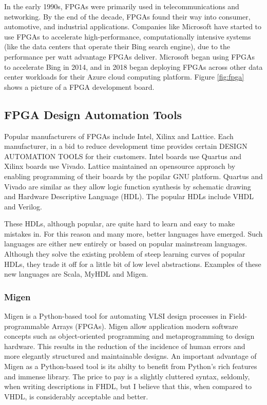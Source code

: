 In the early 1990s, FPGAs were primarily used in telecommunications and networking. By the end of the
decade, FPGAs found their way into consumer, automotive, and industrial applications.
Companies like Microsoft have started to use FPGAs to accelerate high-performance,
computationally intensive systems (like the data centers that operate their Bing search engine),
due to the performance per watt advantage FPGAs deliver. Microsoft began using FPGAs to
accelerate Bing in 2014, and in 2018 began deploying FPGAs across other data center
workloads for their Azure cloud computing platform. Figure \ref{fig:fpga} shows a picture of a FPGA development board.

\subsection{FPGA Design Automation Tools}
Popular manufacturers of FPGAs include Intel, Xilinx and Lattice. Each manufacturer, in a
bid to reduce development time provides certain DESIGN AUTOMATION TOOLS for their
customers. Intel boards use Quartus and Xilinx boards use Vivado. Lattice maintained an
opensource approach by enabling programming of their boards by the popilar GNU platform.
Quartus and Vivado are similar as they allow logic function synthesis by schematic drawing
and Hardware Descriptive Language (HDL). The popular HDLs include VHDL and Verilog. 

These HDLs, although popular, are quite hard to learn and easy to make mistakes in. For this reason and many more, better languages have emerged. Such languages are either new entirely or based on popular mainstream languages. Although they solve the existing problem of steep learning curves of popular HDLs, they trade it off for a little bit of low level abstractions. Examples of these new languages are Scala, MyHDL and Migen. 

\subsubsection{Migen}
Migen is a Python-based tool for automating  VLSI design processes in Field-programmable Arrays (FPGAs).
Migen allow application modern software concepts such as object-oriented programming and metaprogramming to design hardware. This results in the reduction of the incidence of human errors and more elegantly structured and maintainable designs.
An important advantage of Migen as a Python-based tool is its abilty to benefit from Python’s rich features and immense library. The price to pay is a slightly cluttered syntax, seldomly, when writing descriptions in FHDL, but I believe that this, when compared to VHDL, is considerably acceptable and better. 


